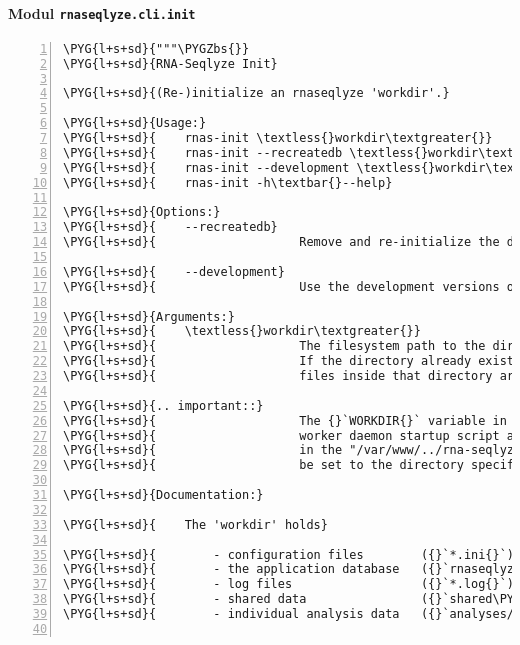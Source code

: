 \paragraph{Modul \texttt{rnaseqlyze.cli.init}}
\label{rnaseqlyze-pdf:modul-rnaseqlyze-cli-init}
\begin{Verbatim}[commandchars=\\\{\},numbers=left,firstnumber=1,stepnumber=5]
\PYG{l+s+sd}{"""\PYGZbs{}}
\PYG{l+s+sd}{RNA-Seqlyze Init}

\PYG{l+s+sd}{(Re-)initialize an rnaseqlyze 'workdir'.}

\PYG{l+s+sd}{Usage:}
\PYG{l+s+sd}{    rnas-init \textless{}workdir\textgreater{}}
\PYG{l+s+sd}{    rnas-init --recreatedb \textless{}workdir\textgreater{}}
\PYG{l+s+sd}{    rnas-init --development \textless{}workdir\textgreater{}}
\PYG{l+s+sd}{    rnas-init -h\textbar{}--help}

\PYG{l+s+sd}{Options:}
\PYG{l+s+sd}{    --recreatedb}
\PYG{l+s+sd}{                    Remove and re-initialize the database if it exists.}

\PYG{l+s+sd}{    --development}
\PYG{l+s+sd}{                    Use the development versions of the config file templates.}

\PYG{l+s+sd}{Arguments:}
\PYG{l+s+sd}{    \textless{}workdir\textgreater{}}
\PYG{l+s+sd}{                    The filesystem path to the directory to be initialized.}
\PYG{l+s+sd}{                    If the directory already exists, by default, existing}
\PYG{l+s+sd}{                    files inside that directory are not overwritten.}

\PYG{l+s+sd}{.. important::}
\PYG{l+s+sd}{                    The {}`WORKDIR{}` variable in the "/etc/init.d/rnaseqlyze.sh"}
\PYG{l+s+sd}{                    worker daemon startup script and the {}`workdir{}` variable}
\PYG{l+s+sd}{                    in the "/var/www/../rna-seqlyze.wsgi" script must both}
\PYG{l+s+sd}{                    be set to the directory specified here!}

\PYG{l+s+sd}{Documentation:}

\PYG{l+s+sd}{    The 'workdir' holds}

\PYG{l+s+sd}{        - configuration files        ({}`*.ini{}`)}
\PYG{l+s+sd}{        - the application database   ({}`rnaseqlyze.db{}`)}
\PYG{l+s+sd}{        - log files                  ({}`*.log{}`)}
\PYG{l+s+sd}{        - shared data                ({}`shared\PYGZus{}data/{}`)}
\PYG{l+s+sd}{        - individual analysis data   ({}`analyses/{}`)}


\end{Verbatim}
